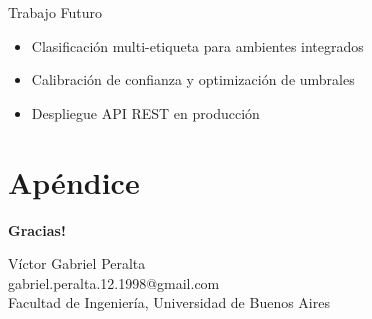 \documentclass[aspectratio=169]{beamer}
\begin{document}
\begin{frame}{Trabajo Futuro}
\begin{itemize}
\item Clasificaci\'on multi-etiqueta para ambientes integrados
\item Calibraci\'on de confianza y optimizaci\'on de umbrales
\item Despliegue API REST en producci\'on
\end{itemize}
\end{frame}

\appendix
\section{Ap\'endice}

\begin{frame}{}
\centering
\Large
\textbf{\textexclamdown Gracias!}

\vspace{1cm}
\normalsize
V\'ictor Gabriel Peralta \\
gabriel.peralta.12.1998@gmail.com \\
Facultad de Ingenier\'ia, Universidad de Buenos Aires
\end{frame}
\end{document}
